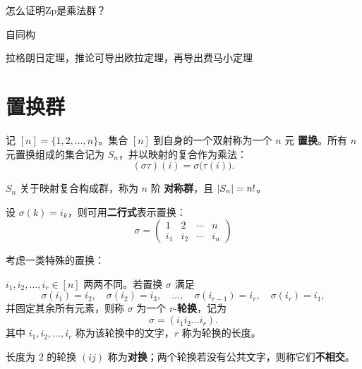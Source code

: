 怎么证明Zp是乘法群？

自同构

拉格朗日定理，推论可导出欧拉定理，再导出费马小定理

\section{置换群}
\begin{definition}[置换群]
    记 \([n]=\{1,2,\dots,n\}\)。集合 \([n]\) 到自身的一个双射称为一个 \(n\) 元
    \textbf{置换}。所有 \(n\) 元置换组成的集合记为 \(S_n\)，并以映射的复合作为乘法：
    \[
        (\sigma\tau)(i)=\sigma\bigl(\tau(i)\bigr).
    \]

    \(S_n\) 关于映射复合构成群，称为 \(n\) 阶
    \textbf{对称群}，且 \(\left|S_n\right|=n! \)。
\end{definition}

设 \(\sigma(k)=i_k\)，则可用\textbf{二行式}表示置换：
\[
    \sigma=
    \begin{pmatrix}
        1   & 2   & \cdots & n   \\
        i_1 & i_2 & \cdots & i_n
    \end{pmatrix}
\]

考虑一类特殊的置换：
\begin{definition}
    \(i_1,i_2,\dots,i_r\in[n]\) 两两不同。若置换 \(\sigma\) 满足
    \[
        \sigma(i_1)=i_2,\quad \sigma(i_2)=i_3,\quad\dots,\quad
        \sigma(i_{r-1})=i_r,\quad \sigma(i_r)=i_1,
    \]
    并固定其余所有元素，则称 \(\sigma\) 为一个 \(r\)-\textbf{轮换}，记为
    \[
        \sigma=(i_1i_2\dots i_r).
    \]
    其中 \(i_1,i_2,\dots,i_r\) 称为该轮换中的文字，\(r\) 称为轮换的长度。

    长度为 \(2\) 的轮换 \((ij)\) 称为\textbf{对换}；两个轮换若没有公共文字，则称它们\textbf{不相交}。
\end{definition}

